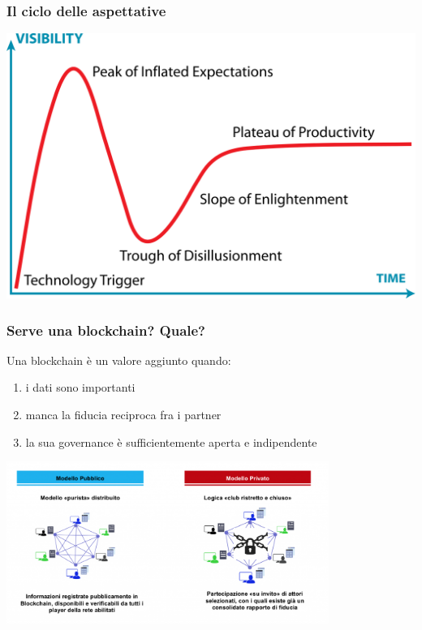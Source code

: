 \documentclass[11pt]{beamer}  %
\begin{document}
\begin{frame}\frametitle{Il ciclo delle aspettative}

  \begin{center}
    \includegraphics[width=\textwidth,clip=false]{pictures/hype-cycle.png}
  \end{center}

\end{frame}

\begin{frame}\frametitle{Serve una blockchain? Quale?}

  Una blockchain \`e un valore aggiunto quando:
  \begin{enumerate}
  \item i dati sono importanti
  \item manca la fiducia reciproca fra i partner
  \item la sua governance \`e \alert{sufficientemente} aperta e indipendente
  \end{enumerate}

  \medskip

  \begin{center}
    \includegraphics[width=10.5cm,clip=false]{pictures/blockchain-private-e-pubbliche.png}
  \end{center}

\end{frame}
\end{document}

